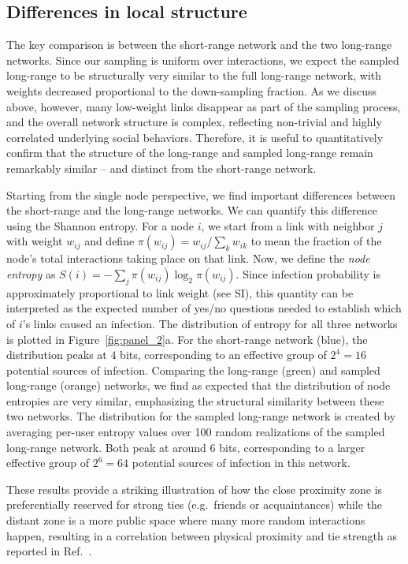 \documentclass[fleqn,10pt]{wlscirep}
\begin{document}
\subsection*{Differences in local structure}
The key comparison is between the short-range network and the two long-range networks.
Since our sampling is uniform over interactions, we expect the sampled long-range to be structurally very similar to the full long-range network, with weights decreased proportional to the down-sampling fraction.
As we discuss above, however, many low-weight links disappear as part of the sampling process, and the overall network structure is complex, reflecting non-trivial and highly correlated underlying social behaviors. 
Therefore, it is useful to quantitatively confirm that the structure of the long-range and sampled long-range remain remarkably similar -- and distinct from the short-range network.

Starting from the single node perspective, we find important differences between the short-range and the long-range networks.
We can quantify this difference using the Shannon entropy. 
For a node $i$, we start from a link with neighbor $j$ with weight $w_{ij}$ and define $\pi(w_{ij})=w_{ij}/\sum_k w_{ik}$ to mean the fraction of the node's total interactions taking place on that link. 
Now, we define the \emph{node entropy} as $S(i) = -\sum_j \pi(w_{ij})\log_2 \pi(w_{ij})$.
Since infection probability is approximately proportional to link weight (see SI), this quantity can be interpreted as the expected number of yes/no questions needed to establish which of $i$'s links caused an infection.
The distribution of entropy for all three networks is plotted in Figure~\ref{fig:panel_2}a.
For the short-range network (blue), the distribution peaks at $4$ bits, corresponding to an effective group of $2^4=16$ potential sources of infection.
Comparing the long-range (green) and sampled long-range (orange) networks, we find as expected that the distribution of node entropies are very similar, emphasizing the structural similarity between these two networks.
The distribution for the sampled long-range network is created by averaging per-user entropy values over 100 random realizations of the sampled long-range network.
Both peak at around $6$ bits, corresponding to a larger effective group of $2^6=64$ potential sources of infection in this network.

These results provide a striking illustration of how the close proximity zone is preferentially reserved for strong ties (e.g.~friends or acquaintances) while the distant zone is a more public space where many more random interactions happen, resulting in a correlation between physical proximity and tie strength as reported in Ref.~\cite{mossong2008social}.
\end{document}

